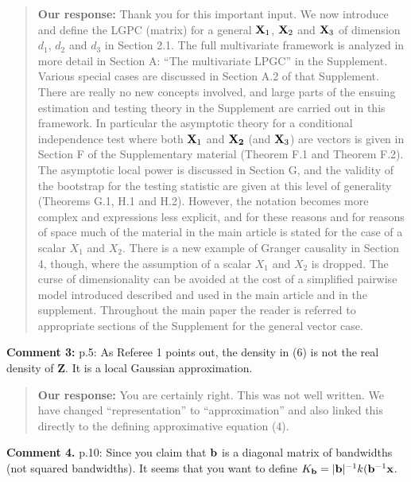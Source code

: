 \documentclass[
  12pt,
  letterpaper]{article}
\numberwithin{equation}{section}
\newcommand{\Z}{\bm{Z}}
\begin{document}
\begin{quote}
\textbf{Our response:} Thank you for this important input. We now introduce and define the LGPC (matrix) for a general \({\bf X}_1\), \({\bf X}_2\) and \({\bf X}_3\) of dimension \(d_1\), \(d_2\) and \(d_3\) in Section 2.1. The full multivariate framework is analyzed in more detail in Section A: ``The multivariate LPGC'' in the Supplement. Various special cases are discussed in Section A.2 of that Supplement. There are really no new concepts involved, and large parts of the ensuing estimation and testing theory in the Supplement are carried out in this framework.
\vspace{.3cm} \newline 
In particular the asymptotic theory for a conditional independence test where both \({\bf X}_1\) and \({\bf X_2}\) (and \({\bf X}_3\)) are vectors is given in Section F of the Supplementary material (Theorem F.1 and Theorem F.2). The asymptotic local power is discussed in Section G, and the validity of the bootstrap for the testing statistic are given at this level of generality (Theorems G.1, H.1 and H.2). However, the notation becomes more complex and expressions less explicit, and for these reasons and for reasons of space much of the material in the main article is stated for the case of a scalar \(X_1\) and \(X_2\). There is a new example of Granger causality in Section 4, though, where the assumption of a scalar \(X_1\) and \(X_2\) is dropped. The curse of dimensionality can be avoided at the cost of a simplified pairwise model introduced described and used in the main article and in the supplement. Throughout the main paper the reader is referred to appropriate sections of the Supplement for the general vector case.
\end{quote}

\textbf{Comment 3:} p.5: As Referee 1 points out, the density in (6) is not the real density of \({\Z}\). It is a local Gaussian approximation.

\begin{quote}
\textbf{Our response:} You are certainly right. This was not well written. We have changed ``representation'' to ``approximation'' and also linked this directly to the defining approximative equation (4).
\end{quote}

\textbf{Comment 4.} p.10: Since you claim that \({\bf b}\) is a diagonal matrix of bandwidths (not squared bandwidths). It seems that you want to define \(K_{\bf b} = |{\bf b}|^{-1}k({\bf b}^{-1}{\bf x}\).
\end{document}
